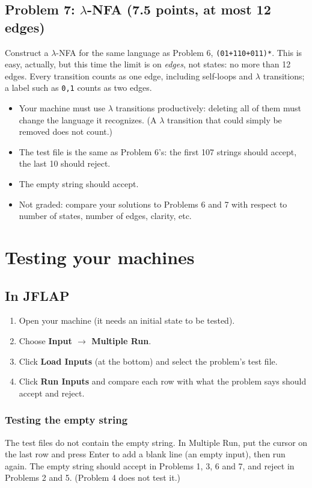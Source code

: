 \documentclass[11pt]{article}
\newcommand{\re}[1]{\texttt{#1}}
\begin{document}
\subsection*{Problem 7: $\lambda$-NFA (7.5 points, at most 12 edges)}
Construct a $\lambda$-NFA for the same language as Problem 6, \re{(01+110+011)*}. This is easy,
actually, but this time the limit is on \emph{edges}, not states: no more than 12 edges. Every
transition counts as one edge, including self-loops and $\lambda$ transitions; a label such as
\texttt{0,1} counts as two edges.
\begin{itemize}
  \item Your machine must use $\lambda$ transitions productively: deleting all of them must
        change the language it recognizes. (A $\lambda$ transition that could simply be removed
        does not count.)
  \item The test file is the same as Problem 6's: the first 107 strings should accept, the last
        10 should reject.
  \item The empty string should accept.
  \item Not graded: compare your solutions to Problems 6 and 7 with respect to number of states,
        number of edges, clarity, etc.
\end{itemize}

\section*{Testing your machines}

\subsection*{In JFLAP}
\begin{enumerate}
  \item Open your machine (it needs an initial state to be tested).
  \item Choose \textbf{Input $\to$ Multiple Run}.
  \item Click \textbf{Load Inputs} (at the bottom) and select the problem's test file.
  \item Click \textbf{Run Inputs} and compare each row with what the problem says should
        accept and reject.
\end{enumerate}

\subsubsection*{Testing the empty string}
The test files do not contain the empty string. In Multiple Run, put the cursor on the last
row and press Enter to add a blank line (an empty input), then run again. The empty string
should accept in Problems 1, 3, 6 and 7, and reject in Problems 2 and 5. (Problem 4 does not
test it.)
\end{document}

